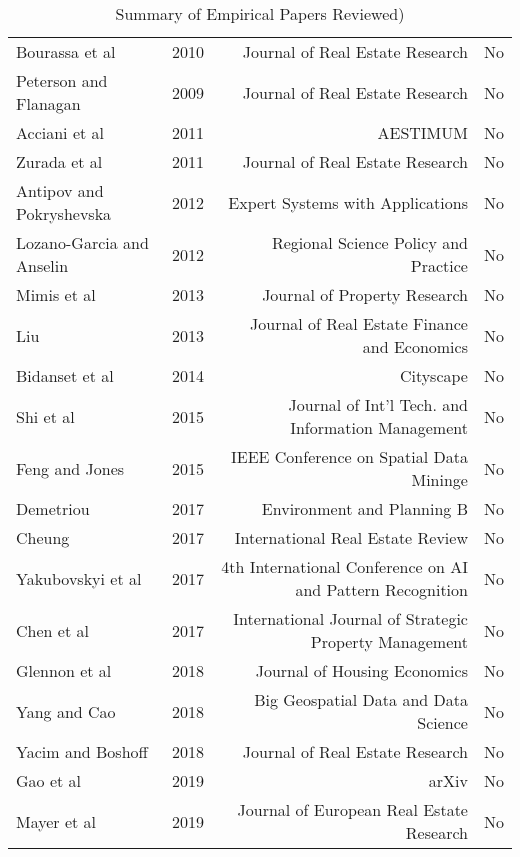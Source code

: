 \documentclass[colTwo]{anon}
\theoremstyle{definition}
\begin{document}
\begin{table*}[h!]
\begin{tabular}{|l|l|r|c|}
Bourassa et al & 2010 & Journal of Real Estate Research & No \\
Peterson and Flanagan & 2009 & Journal of Real Estate Research & No \\
Acciani et al & 2011 & AESTIMUM & No \\
Zurada et al & 2011 & Journal of Real Estate Research & No \\
Antipov and Pokryshevska & 2012 & Expert Systems with Applications & No \\
Lozano-Garcia and Anselin & 2012 & Regional Science Policy and Practice & No \\
Mimis et al & 2013 & Journal of Property Research & No \\
Liu & 2013 & Journal of Real Estate Finance and Economics & No \\
Bidanset et al & 2014 & Cityscape & No \\
Shi et al & 2015 & Journal of Int'l Tech. and Information Management & No \\
Feng and Jones & 2015 & IEEE Conference on Spatial Data Mininge & No \\
Demetriou & 2017 & Environment and Planning B & No \\
Cheung & 2017 & International Real Estate Review & No \\
Yakubovskyi et al & 2017 & 4th International Conference on AI and Pattern Recognition & No \\
Chen et al & 2017 & International Journal of Strategic Property Management & No \\
Glennon et al  & 2018 & Journal of Housing Economics & No \\
Yang and Cao & 2018 & Big Geospatial Data and Data Science & No \\
Yacim and Boshoff & 2018 & Journal of Real Estate Research & No \\
Gao et al & 2019 & arXiv & No \\
Mayer et al & 2019 & Journal of European Real Estate Research & No \\
\hline
\end{tabular}
\caption{Summary of Empirical Papers Reviewed)}
\label{table:A1}
\end{table*}
\end{document}
